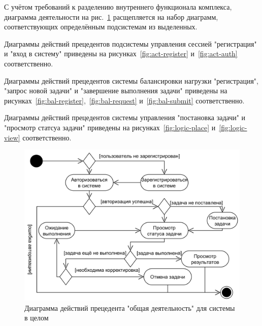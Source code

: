 \documentclass[a4paper,12pt]{report}
\numberwithin{equation}{section}
\begin{document}
  С учётом требований к разделению внутреннего функционала комплекса, диаграмма деятельности на рис.~\ref{fig:act-common}
  расщепляется на набор диаграмм, соответствующих определённым подсистемам из выделенных.
  
  Диаграммы действий прецедентов подсистемы управления сессией "регистрация" и "вход в систему" приведены на рисунках~\ref{fig:act-register} и~\ref{fig:act-auth} соответственно.
  
  Диаграммы действий прецедентов системы балансировки нагрузки "регистрация", "запрос новой задачи" и "завершение выполнения задачи" приведены на рисунках~\ref{fig:bal-register},~\ref{fig:bal-request} и~\ref{fig:bal-submit} соответственно.
  
  Диаграммы действий прецедентов системы управления "постановка задачи" и "просмотр статсуа задачи" приведены на рисунках~\ref{fig:logic-place} и~\ref{fig:logic-view} соответственно.
  
  \begin{figure}[h]
    \centering
    \includegraphics[width=.9\linewidth]{diagrams/common/activity}
    \caption{Диаграмма действий прецедента "общая деятельность" для системы в целом}
    \label{fig:act-common}
  \end{figure}
  
\end{document}
